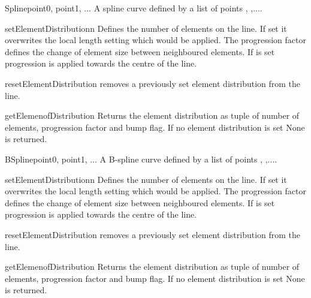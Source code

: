 \begin{classdesc}{Spline}{point0, point1, ...}
A spline curve defined by a list of points , ,....
\end{classdesc}
\begin{methoddesc}[Spline]{setElementDistribution}{n}
Defines the number of elements on the line. If set it overwrites the local length setting which would be applied. The progression factor  defines the change of element size between neighboured elements. If  is set
progression is applied towards the centre of the line.
\end{methoddesc}
\begin{methoddesc}[Spline]{resetElementDistribution}{}
removes a previously set element distribution from the line.
\end{methoddesc}
\begin{methoddesc}[Spline]{getElemenofDistribution}{}
Returns the element distribution as tuple of
number of elements, progression factor and bump flag. If
no element distribution is set None is returned.
\end{methoddesc}

\begin{classdesc}{BSpline}{point0, point1, ...}
A B-spline curve defined by a list of points , ,....
\end{classdesc}
\begin{methoddesc}[BSpline]{setElementDistribution}{n}
Defines the number of elements on the line. If set it overwrites the local length setting which would be applied. The progression factor  defines the change of element size between neighboured elements. If  is set
progression is applied towards the centre of the line.
\end{methoddesc}
\begin{methoddesc}[BSpline]{resetElementDistribution}{}
removes a previously set element distribution from the line.
\end{methoddesc}
\begin{methoddesc}[BSpline]{getElemenofDistribution}{}
Returns the element distribution as tuple of
number of elements, progression factor and bump flag. If
no element distribution is set None is returned.
\end{methoddesc}

